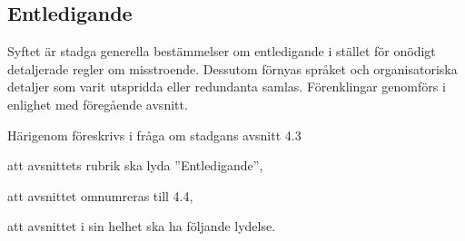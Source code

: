 \documentclass{article}
\begin{document}
\subsection{Entledigande}
Syftet är stadga generella bestämmelser om entledigande i stället för onödigt detaljerade regler om misstroende.
Dessutom förnyas språket och organisatoriska detaljer som varit utspridda eller redundanta samlas.
Förenklingar genomförs i enlighet med föregående avsnitt.

Härigenom föreskrivs i fråga om stadgans avsnitt 4.3
\begin{dels}
    \item att avsnittets rubrik ska lyda ''Entledigande'',
    \item att avsnittet omnumreras till 4.4,
    \item att avsnittet i sin helhet ska ha följande lydelse.
\end{dels}
\end{document}
